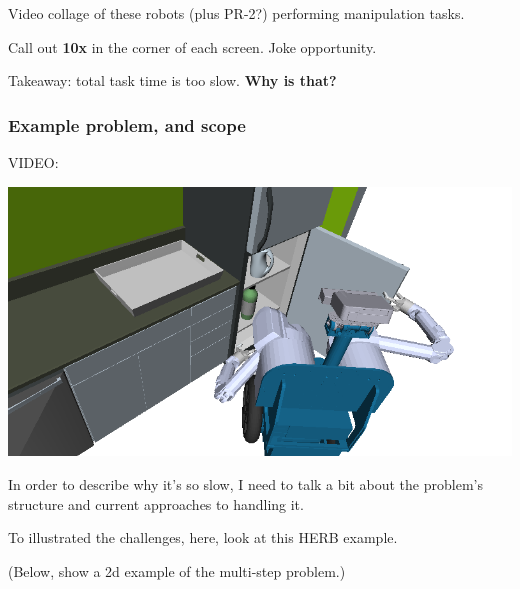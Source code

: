 \documentclass[serif]{beamer}
\begin{document}
\begin{frame}
   Video collage of these robots (plus PR-2?) performing manipulation tasks.

   Call out {\bf 10x} in the corner of each screen.
   Joke opportunity.

   Takeaway: total task time is too slow.
   {\bf Why is that?}
\end{frame}

%   
%   
%   

\begin{frame}
   \frametitle{Example problem, and scope}

   \begin{center}
      VIDEO:
      
      \includegraphics[width=\textwidth]{figs/fridge-intro.png}
      
   \end{center}
   
   In order to describe why it's so slow,
   I need to talk a bit about the problem's structure
   and current approaches to handling it.
   
   To illustrated the challenges,
   here, look at this HERB example.
   
   (Below, show a 2d example of the multi-step problem.)

\end{frame}
\end{document}
